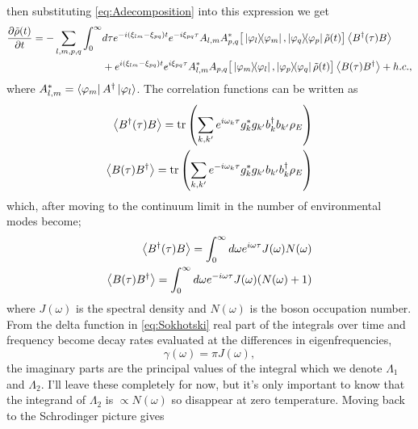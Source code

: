 \documentclass[]{article}
\begin{document}
\begin{itemize}
\begin{itemize}
\begin{align}
\begin{split}
	\end{split}
\end{align}
then substituting \ref{eq:Adecomposition} into this expression we get
\begin{align}
	\begin{split}
		\pdv{\tilde{\rho}(t)}{t} = - \sum_{l,m,p,q}\int_{0}^{\infty}& d\tau e^{-i(\xi_{lm}-\xi_{pq})t} e^{-i\xi_{pq}\tau} A_{l,m}A_{p,q}^{*}\big[\dyad{\varphi_l}{\varphi_m}, \dyad{\varphi_q}{\varphi_p}\tilde{\rho}(t)\big] \expval{B^{\dagger}(\tau)B} \\
		&+ e^{i(\xi_{lm}-\xi_{pq})t} e^{i\xi_{pq}\tau} A_{l,m}^{*}A_{p,q}\big[\dyad{\varphi_m}{\varphi_l}, \dyad{\varphi_p}{\varphi_q}\tilde{\rho}(t)\big] \expval{B(\tau)B^{\dagger}} + h.c.,
	\end{split}
\end{align}
where $A_{l,m}^*=\bra{\varphi_m}A^{\dagger}\ket{\varphi_l}$. The correlation functions can be written as
\begin{align}
	\begin{split}
		\expval{B^{\dagger}(\tau)B} = \tr\left(\sum_{k,k^{\prime}}e^{i\omega_k \tau}g_k^*g_{k^{\prime}} b_k^{\dagger}b_{k^{\prime}}\rho_E\right)\\
		\expval{B(\tau)B^{\dagger}}=\tr\left(\sum_{k,k^{\prime}}e^{-i\omega_k \tau}g_k^*g_{k^{\prime}} b_{k^{\prime}}b_k^{\dagger}\rho_E\right)
	\end{split}
\end{align}
which, after moving to the continuum limit in the number of environmental modes become;
\begin{align}
	\begin{split}
		\expval{B^{\dagger}(\tau)B} = \int_0^{\infty}d\omega e^{i\omega \tau}J(\omega)N(\omega)\\
		\expval{B(\tau)B^{\dagger}}=\int_0^{\infty}d\omega e^{-i\omega \tau}J(\omega)(N(\omega)+1)
	\end{split}
\end{align}
where $J(\omega)$ is the spectral density and $N(\omega)$ is the boson occupation number. From the delta function in \ref{eq:Sokhotski} real part of the integrals over time and frequency become decay rates evaluated at the differences in eigenfrequencies,
\begin{equation}
\gamma(\omega)=\pi J(\omega),
\end{equation}
the imaginary parts are the principal values of the integral which we denote $\Lambda_1$ and $\Lambda_2$. I'll leave these completely for now, but it's only important to know that the integrand of $\Lambda_2$ is $ \propto N(\omega)$ so disappear at zero temperature.
Moving back to the Schrodinger picture gives


\end{itemize}
\end{itemize}
\end{document}

